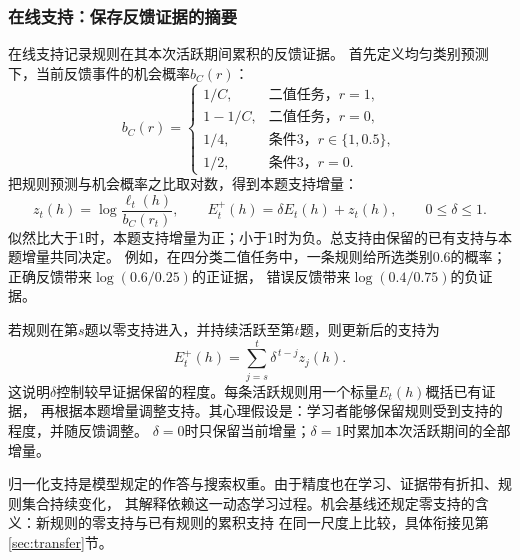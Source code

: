 \documentclass[11pt,a4paper]{article}
\numberwithin{equation}{section}
\begin{document}
\subsubsection{在线支持：保存反馈证据的摘要}
\label{sec:evidence}
在线支持记录规则在其本次活跃期间累积的反馈证据。
首先定义均匀类别预测下，当前反馈事件的机会概率$b_C(r)$：
\begin{equation}
b_C(r)=\begin{cases}
1/C,&\text{二值任务，}r=1,\\
1-1/C,&\text{二值任务，}r=0,\\
1/4,&\text{条件3，}r\in\{1,0.5\},\\
1/2,&\text{条件3，}r=0.
\end{cases}
\end{equation}
把规则预测与机会概率之比取对数，得到本题支持增量：
\begin{equation}
z_t(h)=\log\frac{\ell_t(h)}{b_C(r_t)},\qquad
E_t^+(h)=\delta E_t(h)+z_t(h),\qquad 0\leq\delta\leq1.
\label{eq:evidence}
\end{equation}
似然比大于1时，本题支持增量为正；小于1时为负。总支持由保留的已有支持与本题增量共同决定。
例如，在四分类二值任务中，一条规则给所选类别0.6的概率；正确反馈带来$\log(0.6/0.25)$的正证据，
错误反馈带来$\log(0.4/0.75)$的负证据。

若规则在第$s$题以零支持进入，并持续活跃至第$t$题，则更新后的支持为
\begin{equation}
E_t^+(h)=\sum_{j=s}^{t}\delta^{\,t-j}z_j(h).
\label{eq:evidence-expansion}
\end{equation}
这说明$\delta$控制较早证据保留的程度。每条活跃规则用一个标量$E_t(h)$概括已有证据，
再根据本题增量调整支持。其心理假设是：学习者能够保留规则受到支持的程度，并随反馈调整。
$\delta=0$时只保留当前增量；$\delta=1$时累加本次活跃期间的全部增量。

归一化支持是模型规定的作答与搜索权重。由于精度也在学习、证据带有折扣、规则集合持续变化，
其解释依赖这一动态学习过程。机会基线还规定零支持的含义：新规则的零支持与已有规则的累积支持
在同一尺度上比较，具体衔接见第\ref{sec:transfer}节。
\end{document}
